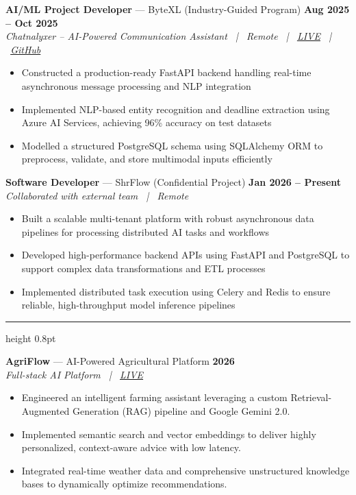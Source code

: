 \documentclass[10pt,a4paper]{article}
\newcommand{\resumesection}[1]{%
  \vspace{5pt}%
  \noindent{\large\textbf{#1}}\par
  \vspace{1pt}%
  \hrule height 0.8pt
  \vspace{3pt}%
}
\begin{document}
\noindent\textbf{AI/ML Project Developer} --- ByteXL (Industry-Guided Program) \hfill \textbf{Aug 2025 -- Oct 2025} \\
\textit{Chatnalyxer -- AI-Powered Communication Assistant \ | \ Remote \ | \ \href{http://chatnalyxer.app/}{LIVE} \ | \ \href{https://github.com/Rahul-pamula/chatnalyxer.git}{GitHub}}
\begin{itemize}[leftmargin=1.2em, topsep=1pt, itemsep=0pt, parsep=0pt]
    \item Constructed a production-ready FastAPI backend handling real-time asynchronous message processing and NLP integration
    \item Implemented NLP-based entity recognition and deadline extraction using Azure AI Services, achieving 96\% accuracy on test datasets
    \item Modelled a structured PostgreSQL schema using SQLAlchemy ORM to preprocess, validate, and store multimodal inputs efficiently
\end{itemize}

\vspace{3pt}

\noindent\textbf{Software Developer} --- ShrFlow (Confidential Project) \hfill \textbf{Jan 2026 -- Present} \\
\textit{Collaborated with external team \ | \ Remote}
\begin{itemize}[leftmargin=1.2em, topsep=1pt, itemsep=0pt, parsep=0pt]
    \item Built a scalable multi-tenant platform with robust asynchronous data pipelines for processing distributed AI tasks and workflows
    \item Developed high-performance backend APIs using FastAPI and PostgreSQL to support complex data transformations and ETL processes
    \item Implemented distributed task execution using Celery and Redis to ensure reliable, high-throughput model inference pipelines
\end{itemize}

\resumesection{PROJECTS}

\noindent\textbf{AgriFlow} --- AI-Powered Agricultural Platform \hfill \textbf{2026} \\
\textit{Full-stack AI Platform \ | \ \href{https://agriflow-frontend.onrender.com/}{LIVE}}
\begin{itemize}[leftmargin=1.2em, topsep=1pt, itemsep=0pt, parsep=0pt]
    \item Engineered an intelligent farming assistant leveraging a custom Retrieval-Augmented Generation (RAG) pipeline and Google Gemini 2.0.
    \item Implemented semantic search and vector embeddings to deliver highly personalized, context-aware advice with low latency.
    \item Integrated real-time weather data and comprehensive unstructured knowledge bases to dynamically optimize recommendations.
\end{itemize}
\end{document}

